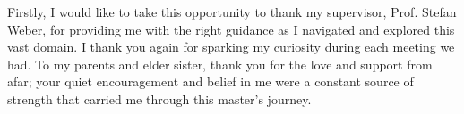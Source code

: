 \documentclass[a4paper, 12pt, oneside]{report}         %
\begin{document}

\begin{thesisacknowledgments}                     %
  Firstly, I would like to take this opportunity to thank my supervisor, Prof. Stefan Weber, for providing me with the right guidance as I navigated and explored this vast domain. I thank you again for sparking my curiosity during each meeting we had. To my parents and elder sister, thank you for the love and support from afar; your quiet encouragement and belief in me were a constant source of strength that carried me through this master’s journey.         %
\end{thesisacknowledgments}                       %
  
  
\tableofcontents                                  %
\listoftables                                     %
\listoffigures                                    %

\setlength{\headheight}{14.49998pt}











\begin{appendix}

% 
\end{appendix}
\end{document}
